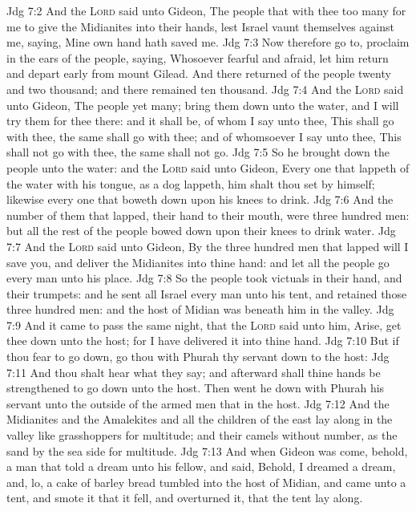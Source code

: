 \vs Jdg 7:2 And the \textsc{Lord} said unto Gideon, The people that  with thee  too many for me to give the Midianites into their hands, lest Israel vaunt themselves against me, saying, Mine own hand hath saved me.
\vs Jdg 7:3 Now therefore go to, proclaim in the ears of the people, saying, Whosoever  fearful and afraid, let him return and depart early from mount Gilead. And there returned of the people twenty and two thousand; and there remained ten thousand.
\vs Jdg 7:4 And the \textsc{Lord} said unto Gideon, The people  yet  many; bring them down unto the water, and I will try them for thee there: and it shall be,  of whom I say unto thee, This shall go with thee, the same shall go with thee; and of whomsoever I say unto thee, This shall not go with thee, the same shall not go.
\vs Jdg 7:5 So he brought down the people unto the water: and the \textsc{Lord} said unto Gideon, Every one that lappeth of the water with his tongue, as a dog lappeth, him shalt thou set by himself; likewise every one that boweth down upon his knees to drink.
\vs Jdg 7:6 And the number of them that lapped,  their hand to their mouth, were three hundred men: but all the rest of the people bowed down upon their knees to drink water.
\vs Jdg 7:7 And the \textsc{Lord} said unto Gideon, By the three hundred men that lapped will I save you, and deliver the Midianites into thine hand: and let all the  people go every man unto his place.
\vs Jdg 7:8 So the people took victuals in their hand, and their trumpets: and he sent all  Israel every man unto his tent, and retained those three hundred men: and the host of Midian was beneath him in the valley.
\vs Jdg 7:9 And it came to pass the same night, that the \textsc{Lord} said unto him, Arise, get thee down unto the host; for I have delivered it into thine hand.
\vs Jdg 7:10 But if thou fear to go down, go thou with Phurah thy servant down to the host:
\vs Jdg 7:11 And thou shalt hear what they say; and afterward shall thine hands be strengthened to go down unto the host. Then went he down with Phurah his servant unto the outside of the armed men that  in the host.
\vs Jdg 7:12 And the Midianites and the Amalekites and all the children of the east lay along in the valley like grasshoppers for multitude; and their camels  without number, as the sand by the sea side for multitude.
\vs Jdg 7:13 And when Gideon was come, behold,  a man that told a dream unto his fellow, and said, Behold, I dreamed a dream, and, lo, a cake of barley bread tumbled into the host of Midian, and came unto a tent, and smote it that it fell, and overturned it, that the tent lay along.
